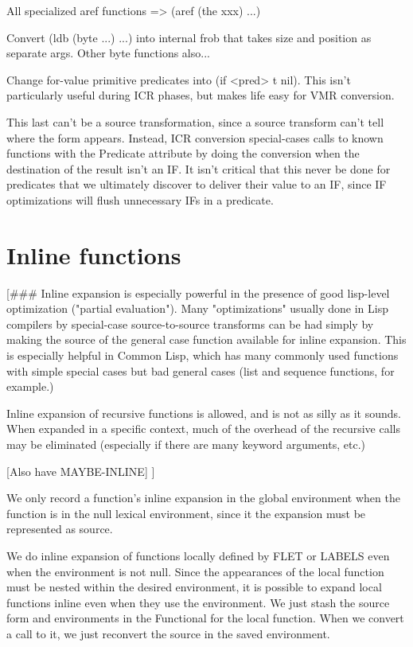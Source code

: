 All specialized aref functions => (aref (the xxx) ...)

Convert (ldb (byte ...) ...) into internal frob that takes size and position as
separate args.  Other byte functions also...

Change for-value primitive predicates into (if <pred> t nil).  This isn't
particularly useful during ICR phases, but makes life easy for VMR conversion.

This last can't be a source transformation, since a source transform can't tell
where the form appears.  Instead, ICR conversion special-cases calls to known
functions with the Predicate attribute by doing the conversion when the
destination of the result isn't an IF.  It isn't critical that this never be
done for predicates that we ultimately discover to deliver their value to an
IF, since IF optimizations will flush unnecessary IFs in a predicate.


\section{Inline functions}

[\#\#\# Inline expansion is especially powerful in the presence of good lisp-level
optimization ("partial evaluation").  Many "optimizations" usually done in Lisp
compilers by special-case source-to-source transforms can be had simply by
making the source of the general case function available for inline expansion.
This is especially helpful in Common Lisp, which has many commonly used
functions with simple special cases but bad general cases (list and sequence
functions, for example.)

Inline expansion of recursive functions is allowed, and is not as silly as it
sounds.  When expanded in a specific context, much of the overhead of the
recursive calls may be eliminated (especially if there are many keyword
arguments, etc.)

[Also have MAYBE-INLINE]
]

We only record a function's inline expansion in the global environment when the
function is in the null lexical environment, since it the expansion must be
represented as source.

We do inline expansion of functions locally defined by FLET or LABELS even when
the environment is not null.  Since the appearances of the local function must
be nested within the desired environment, it is possible to expand local
functions inline even when they use the environment.  We just stash the source
form and environments in the Functional for the local function.  When we
convert a call to it, we just reconvert the source in the saved environment.

